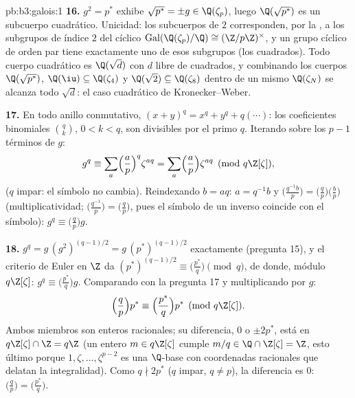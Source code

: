 \begin{solution}{pb:b3:galois:1}
\textbf{16.} $g^2 = p^*$ exhibe $\sqrt{p^*} = \pm g \in
\Q(\zeta_p)$, luego $\Q(\sqrt{p^*})$ es un subcuerpo cuadrático.
Unicidad: los subcuerpos de  $2$
corresponden, por la , a los subgrupos de índice $2$ del cíclico
$\operatorname{Gal}(\Q(\zeta_p)/\Q) \cong (\Z/p\Z)^\times$,
y un grupo cíclico de orden par tiene exactamente uno de esos subgrupos
(los cuadrados). Todo cuerpo cuadrático es $\Q(\sqrt{d})$ con $d$ libre
de cuadrados, y combinando los cuerpos $\Q(\sqrt{p^*})$,
$\Q(\iu) \subseteq \Q(\zeta_4)$ y $\Q(\sqrt2) \subseteq \Q(\zeta_8)$
dentro de un mismo $\Q(\zeta_N)$ se alcanza todo $\sqrt d$: el caso
cuadrático de Kronecker--Weber.

\textbf{17.} En todo anillo conmutativo, $(x + y)^q = x^q + y^q
+ q(\cdots)$: los coeficientes binomiales $\binom qk$, $0 < k <
q$, son divisibles por el primo $q$. Iterando sobre los $p - 1$ términos
de $g$:
\[
g^q \equiv \sum_{a}\Bigl(\frac ap\Bigr)^{q}\zeta^{aq}
= \sum_a\Bigl(\frac ap\Bigr)\zeta^{aq}
\pmod{q\Z[\zeta]},
\]
($q$ impar: el símbolo no cambia). Reindexando $b = aq$: $a =
q^{-1}b$ y $\bigl(\frac{q^{-1}b}p\bigr) =
\bigl(\frac{q}p\bigr)\bigl(\frac bp\bigr)$ (multiplicatividad;
$\bigl(\frac{q^{-1}}p\bigr) = \bigl(\frac qp\bigr)$, pues el símbolo de
un inverso coincide con el símbolo): $g^q \equiv
\bigl(\frac qp\bigr)g$.

\textbf{18.} $g^q = g\,(g^2)^{(q-1)/2} = g\,(p^*)^{(q-1)/2}$
exactamente (pregunta 15), y el criterio de Euler en $\Z$ da
$(p^*)^{(q-1)/2} \equiv \bigl(\frac{p^*}q\bigr) \pmod q$,
de donde, módulo $q\Z[\zeta]$: $g^q \equiv \bigl(\frac{p^*}q\bigr)g$.
Comparando con la pregunta 17 y multiplicando por $g$:
\[
\Bigl(\frac qp\Bigr)p^* \equiv \Bigl(\frac{p^*}q\Bigr)p^*
\pmod{q\Z[\zeta]} .
\]
Ambos miembros son enteros racionales; su diferencia, $0$ o $\pm2p^*$,
está en $q\Z[\zeta] \cap \Z = q\Z$ (un entero $m
\in q\Z[\zeta]$ cumple $m/q \in \Q \cap \Z[\zeta] = \Z$, esto último
porque $1, \zeta, \dots, \zeta^{p-2}$ es una $\Q$-base con coordenadas
racionales que delatan la integralidad). Como $q \nmid 2p^*$ ($q$ impar,
$q \neq p$), la diferencia es $0$: $\bigl(\frac qp\bigr) =
\bigl(\frac{p^*}q\bigr)$.


\end{solution}
